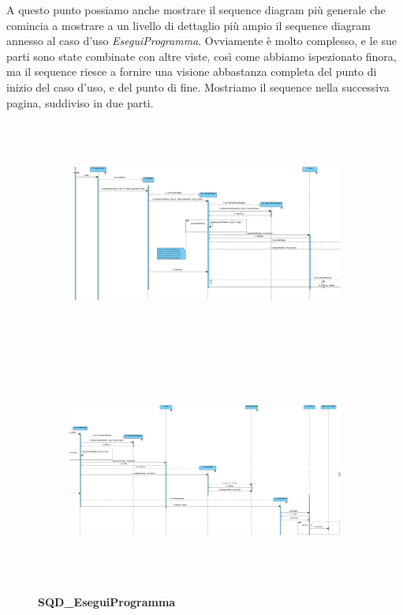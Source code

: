 \documentclass[11pt]{article}
\begin{document}
A questo punto possiamo anche mostrare il sequence diagram più generale che comincia a mostrare a un livello di dettaglio più ampio il sequence diagram annesso al caso d'uso \emph{EseguiProgramma}. Ovviamente è molto complesso, e le sue parti sono state combinate con altre viste, così come abbiamo ispezionato finora, ma il sequence riesce a fornire una visione abbastanza completa del punto di inizio del caso d'uso, e del punto di fine. Mostriamo il sequence nella successiva pagina, suddiviso in due parti.
\begin{figure}[!h]
\vspace*{-4cm}

\centering
	\begin{subfigure}{600px}
	\hspace*{-4.3cm}
	\includegraphics[width=600px, height=281px]{SQD_EseguiProgramma_1.png}\\
	\end{subfigure}
	\begin{subfigure}{600px}
	\hspace*{-4.3cm}
	\includegraphics[width=600px, height=281px]{SQD_EseguiProgramma_2.png}\\
	\end{subfigure}
	\small\textbf{SQD\_EseguiProgramma}
\end{figure}\\
\end{document}
